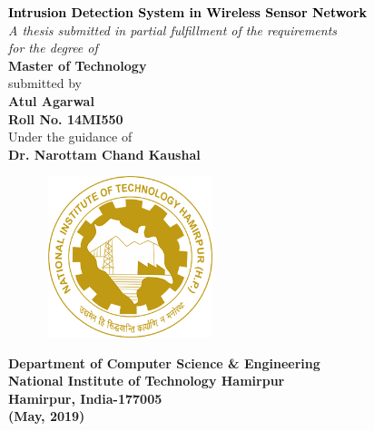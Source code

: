 \thispagestyle{empty}
\graphicspath{{Figures/PNG/}{Figures/}}
\begin{center}
	\vspace{8mm}
	\Large \textcolor{black}{\textbf{Intrusion Detection System in Wireless Sensor Network}}\\
	\vspace{10mm}
	\large \textit{A thesis submitted in partial fulfillment of the requirements \\ for the degree of} \\
	\vspace{8mm}
	\Large {\textbf{Master of Technology}} \\
    \vspace{8mm}
    \large submitted by \\
    \vspace{8mm}
	\textbf{{\Large Atul Agarwal} \\ {\large Roll No. 14MI550}} \\
	\vspace{6mm}
	\large Under the guidance of \\
	\Large \textbf{Dr. Narottam Chand Kaushal}
	\vspace{5mm}
	\begin{figure}[h!]
		\centering
		\includegraphics[height=4.7cm,width=5cm]{NIT-Logo.png}
	\end{figure}
	\par\vspace{5mm}
	\large \textbf{Department of Computer Science \& Engineering\\
			National Institute of Technology Hamirpur\\
			Hamirpur, India-177005 \\
			(May, 2019)}
\end{center}
\thispagestyle{empty}
